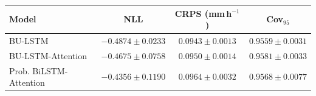 \begin{tabular}{@{}lccc@{}}
\hline
\textbf{Model} &
\textbf{NLL} &
\textbf{CRPS (mm\,h$^{-1}$)} &
\textbf{Cov$_{95}$} \\
\hline

BU-LSTM &
$-0.4874 \pm 0.0233$ &
$0.0943 \pm 0.0013$ &
$0.9559 \pm 0.0031$ \\

BU-LSTM-Attention &
$-0.4675 \pm 0.0758$ &
$0.0950 \pm 0.0014$ &
$0.9581 \pm 0.0033$ \\

Prob. BiLSTM-Attention &
$-0.4356 \pm 0.1190$ &
$0.0964 \pm 0.0032$ &
$0.9568 \pm 0.0077$ \\

\hline
\end{tabular}